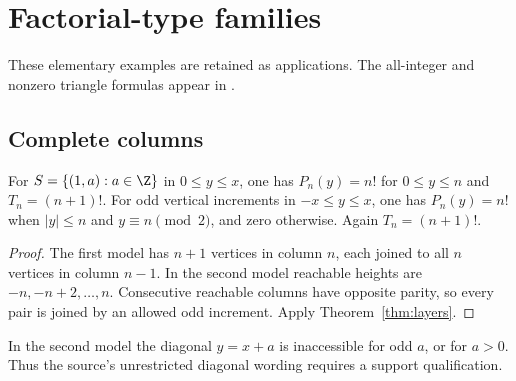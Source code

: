 \section{Factorial-type families}
These elementary examples are retained as applications. The all-integer and nonzero triangle formulas appear in \cite[Example 3.14]{EastHamV1}.
\subsection{Complete columns}
\begin{proposition}\label{prop:complete}
For $S=\{(1,a):a\in\Z\}$ in $0\le y\le x$, one has $P_n(y)=n!$ for $0\le y\le n$ and $T_n=(n+1)!$.
For odd vertical increments in $-x\le y\le x$, one has $P_n(y)=n!$ when $|y|\le n$ and $y\equiv n\pmod2$, and zero otherwise. Again $T_n=(n+1)!$.
\end{proposition}
\begin{proof}
The first model has $n+1$ vertices in column $n$, each joined to all $n$ vertices in column $n-1$. In the second model reachable heights are $-n,-n+2,\ldots,n$. Consecutive reachable columns have opposite parity, so every pair is joined by an allowed odd increment. Apply Theorem~\ref{thm:layers}.
\end{proof}
In the second model the diagonal $y=x+a$ is inaccessible for odd $a$, or for $a>0$. Thus the source's unrestricted diagonal wording requires a support qualification.

